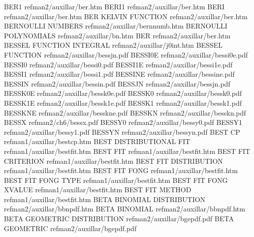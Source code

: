 BER1                                    refman2/auxillar/ber.htm
BERI1                                   refman2/auxillar/ber.htm
BERI                                    refman2/auxillar/ber.htm
BER KELVIN FUNCTION                     refman2/auxillar/ber.htm
BERNOULLI NUMBERS                       refman2/auxillar/bernnumb.htm
BERNOULLI POLYNOMIALS                   refman2/auxillar/bn.htm
BER                                     refman2/auxillar/ber.htm
BESSEL FUNCTION INTEGRAL                refman2/auxillar/j0int.htm
BESSEL FUNCTION                         refman2/auxillar/bessjn.pdf
BESSI0E                                 refman2/auxillar/bessi0e.pdf
BESSI0                                  refman2/auxillar/bessi0.pdf
BESSI1E                                 refman2/auxillar/bessi1e.pdf
BESSI1                                  refman2/auxillar/bessi1.pdf
BESSINE                                 refman2/auxillar/bessine.pdf
BESSIN                                  refman2/auxillar/bessin.pdf
BESSJN                                  refman2/auxillar/bessjn.pdf
BESSK0E                                 refman2/auxillar/bessk0e.pdf
BESSK0                                  refman2/auxillar/bessk0.pdf
BESSK1E                                 refman2/auxillar/bessk1e.pdf
BESSK1                                  refman2/auxillar/bessk1.pdf
BESSKNE                                 refman2/auxillar/besskne.pdf
BESSKN                                  refman2/auxillar/besskn.pdf
BESSX                                   refman2/ch6/bessx.pdf
BESSY0                                  refman2/auxillar/bessy0.pdf
BESSY1                                  refman2/auxillar/bessy1.pdf
BESSYN                                  refman2/auxillar/bessyn.pdf
BEST CP                                 refman1/auxillar/bestcp.htm
BEST DISTRIBUTIONAL FIT                 refman1/auxillar/bestfit.htm
BEST FIT                                refman1/auxillar/bestfit.htm
BEST FIT CRITERION                      refman1/auxillar/bestfit.htm
BEST FIT DISTRIBUTION                   refman1/auxillar/bestfit.htm
BEST FIT FONG                           refman1/auxillar/bestfit.htm
BEST FIT FONG TYPE                      refman1/auxillar/bestfit.htm
BEST FIT FONG XVALUE                    refman1/auxillar/bestfit.htm
BEST FIT METHOD                         refman1/auxillar/bestfit.htm
BETA BINOMIAL DISTRIBUTION              refman2/auxillar/bbnpdf.htm
BETA BINOMIAL                           refman2/auxillar/bbnpdf.htm
BETA GEOMETRIC DISTRIBUTION             refman2/auxillar/bgepdf.pdf
BETA GEOMETRIC                          refman2/auxillar/bgepdf.pdf
